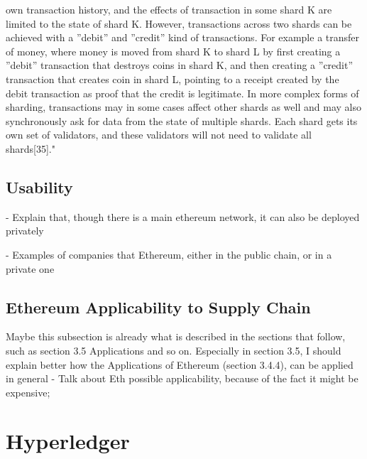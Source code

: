 own transaction history, and the effects of transaction in some shard K are limited to the
state of shard K. However, transactions across two shards can be achieved with a ”debit”
and ”credit” kind of transactions. For example a transfer of money, where money is moved
from shard K to shard L by first creating a ”debit” transaction that destroys coins in shard
K, and then creating a ”credit” transaction that creates coin in shard L, pointing to a receipt
created by the debit transaction as proof that the credit is legitimate. In more complex
forms of sharding, transactions may in some cases affect other shards as well and may also
synchronously ask for data from the state of multiple shards. Each shard gets its own set of
validators, and these validators will not need to validate all shards[35]."

\subsection{Usability}
- Explain that, though there is a main ethereum network, it can also be deployed privately

- Examples of companies that Ethereum, either in the public chain, or in a private one

\subsection{Ethereum Applicability to Supply Chain}
Maybe this subsection is already what is described in the sections that follow, such as section 3.5 Applications and so on. Especially in section 3.5, I should explain better how the Applications of Ethereum (section 3.4.4), can be applied in general
- Talk about Eth possible applicability, because of the fact it might be expensive;

\section{Hyperledger}

